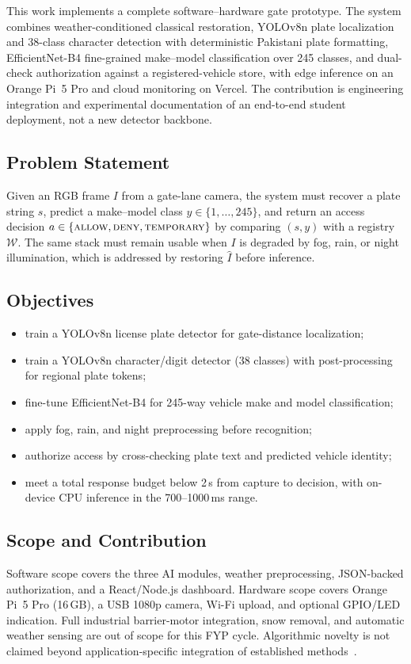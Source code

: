 \documentclass[10pt, conference]{IEEEtran}
\begin{document}
This work implements a complete software--hardware gate prototype. The system combines weather-conditioned classical restoration, YOLOv8n plate localization and 38-class character detection with deterministic Pakistani plate formatting, EfficientNet-B4 fine-grained make--model classification over 245 classes, and dual-check authorization against a registered-vehicle store, with edge inference on an Orange Pi~5 Pro and cloud monitoring on Vercel. The contribution is engineering integration and experimental documentation of an end-to-end student deployment, not a new detector backbone.

\subsection{Problem Statement}
Given an RGB frame $I$ from a gate-lane camera, the system must recover a plate string $s$, predict a make--model class $y\in\{1,\ldots,245\}$, and return an access decision $a\in\{\textsc{allow},\textsc{deny},\textsc{temporary}\}$ by comparing $(s,y)$ with a registry $\mathcal{W}$. The same stack must remain usable when $I$ is degraded by fog, rain, or night illumination, which is addressed by restoring $\hat{I}$ before inference.

\subsection{Objectives}
\begin{itemize}[leftmargin=*,itemsep=1pt]
\item train a YOLOv8n license plate detector for gate-distance localization;
\item train a YOLOv8n character/digit detector (38 classes) with post-processing for regional plate tokens;
\item fine-tune EfficientNet-B4 for 245-way vehicle make and model classification;
\item apply fog, rain, and night preprocessing before recognition;
\item authorize access by cross-checking plate text and predicted vehicle identity;
\item meet a total response budget below 2\,s from capture to decision, with on-device CPU inference in the 700--1000\,ms range.
\end{itemize}

\subsection{Scope and Contribution}
Software scope covers the three AI modules, weather preprocessing, JSON-backed authorization, and a React/Node.js dashboard. Hardware scope covers Orange Pi~5 Pro (16\,GB), a USB 1080p camera, Wi-Fi upload, and optional GPIO/LED indication. Full industrial barrier-motor integration, snow removal, and automatic weather sensing are out of scope for this FYP cycle. Algorithmic novelty is not claimed beyond application-specific integration of established methods~\cite{he2009dcp,tan2019efficientnet,ultralytics2023yolov8}.
\end{document}
